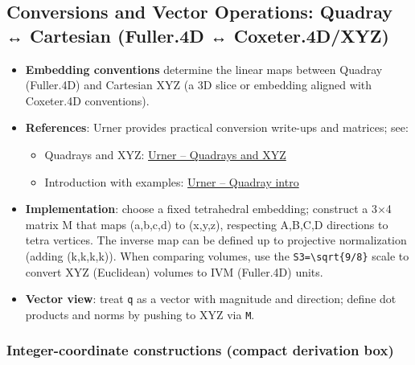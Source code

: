\documentclass[
]{article}
\providecommand{\tightlist}{%
  \setlength{\itemsep}{0pt}\setlength{\parskip}{0pt}}
\begin{document}
\hypertarget{conversions-and-vector-operations-quadray-cartesian-fuller.4d-coxeter.4dxyz}{%
\subsection{Conversions and Vector Operations: Quadray ↔ Cartesian
(Fuller.4D ↔
Coxeter.4D/XYZ)}\label{conversions-and-vector-operations-quadray-cartesian-fuller.4d-coxeter.4dxyz}}

\begin{itemize}
\tightlist
\item
  \textbf{Embedding conventions} determine the linear maps between
  Quadray (Fuller.4D) and Cartesian XYZ (a 3D slice or embedding aligned
  with Coxeter.4D conventions).
\item
  \textbf{References}: Urner provides practical conversion write-ups and
  matrices; see:

  \begin{itemize}
  \tightlist
  \item
    Quadrays and XYZ:
    \href{https://www.grunch.net/synergetics/quadxyz.html}{Urner --
    Quadrays and XYZ}
  \item
    Introduction with examples:
    \href{https://www.grunch.net/synergetics/quadintro.html}{Urner --
    Quadray intro}
  \end{itemize}
\item
  \textbf{Implementation}: choose a fixed tetrahedral embedding;
  construct a 3×4 matrix M that maps (a,b,c,d) to (x,y,z), respecting
  A,B,C,D directions to tetra vertices. The inverse map can be defined
  up to projective normalization (adding (k,k,k,k)). When comparing
  volumes, use the \texttt{S3=\textbackslash{}sqrt\{9/8\}} scale to
  convert XYZ (Euclidean) volumes to IVM (Fuller.4D) units.
\item
  \textbf{Vector view}: treat \texttt{q} as a vector with magnitude and
  direction; define dot products and norms by pushing to XYZ via
  \texttt{M}.
\end{itemize}

\hypertarget{integer-coordinate-constructions-compact-derivation-box}{%
\subsubsection{Integer-coordinate constructions (compact derivation
box)}\label{integer-coordinate-constructions-compact-derivation-box}}
\end{document}
